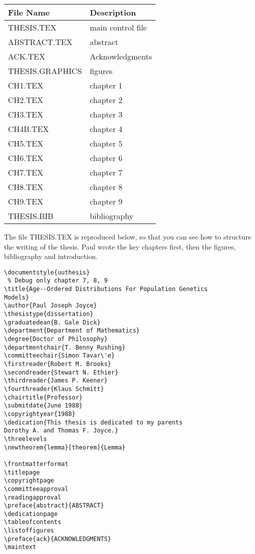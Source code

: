 \begin{center}
\begin{tabular}{|l|l|}
\hline
File Name               & Description \\
\hline
THESIS.TEX              & main control file \\
ABSTRACT.TEX         & abstract \\
ACK.TEX              & Acknowledgments \\
THESIS.GRAPHICS         & figures \\
CH1.TEX            & chapter 1 \\
CH2.TEX            & chapter 2 \\
CH3.TEX            & chapter 3 \\
CH4B.TEX            & chapter 4 \\
CH5.TEX            & chapter 5 \\
CH6.TEX            & chapter 6 \\
CH7.TEX            & chapter 7 \\
CH8.TEX            & chapter 8 \\
CH9.TEX            & chapter 9 \\
THESIS.BIB          & bibliography \\
\hline
\end{tabular}
\end{center}
The file THESIS.TEX is reproduced below, so that you can see how to
structure the writing of the thesis. Paul wrote the key chapters first,
then the figures, bibliography and introduction.


\begin{verbatim}
\documentstyle{uuthesis}
 % Debug only chapter 7, 8, 9
\title{Age--Ordered Distributions For Population Genetics
Models}
\author{Paul Joseph Joyce}
\thesistype{dissertation}
\graduatedean{B. Gale Dick}
\department{Department of Mathematics}
\degree{Doctor of Philosophy}
\departmentchair{T. Benny Rushing}
\committeechair{Simon Tavar\'e}
\firstreader{Robert M. Brooks}
\secondreader{Stewart N. Ethier}
\thirdreader{James P. Keener}
\fourthreader{Klaus Schmitt}
\chairtitle{Professor}
\submitdate{June 1988}
\copyrightyear{1988}
\dedication{This thesis is dedicated to my parents
Dorothy A. and Thomas F. Joyce.}
\threelevels
\newtheorem{lemma}[theorem]{Lemma}

\frontmatterformat
\titlepage
\copyrightpage
\committeeapproval
\readingapproval
\preface{abstract}{ABSTRACT}
\dedicationpage
\tableofcontents
\listoffigures
\preface{ack}{ACKNOWLEDGMENTS}
\maintext











\end{verbatim}

